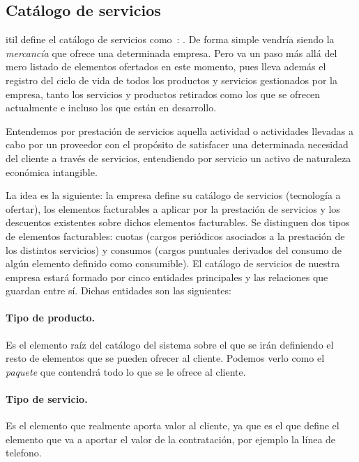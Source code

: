 \subsection{Catálogo de servicios}
\label{sub:catalogo-chap-analisis}

\acrshort{itil} define el catálogo de servicios como~\cite{catalogoITIL}:
. De forma simple vendría siendo la \textit{mercancía} que ofrece una determinada empresa. Pero va un paso más allá del mero listado de elementos ofertados en este momento, pues lleva además el registro del ciclo de vida de todos los productos y servicios gestionados por la empresa, tanto los servicios y productos retirados como los que se ofrecen actualmente e incluso los que están en desarrollo.

Entendemos por prestación de servicios aquella actividad o actividades llevadas a cabo por un proveedor con el propósito de satisfacer una determinada necesidad del cliente a través de servicios, entendiendo por servicio un activo de naturaleza económica intangible.

La idea es la siguiente: la empresa define su catálogo de servicios (tecnología a ofertar), los elementos facturables a aplicar por la prestación de servicios y los descuentos existentes sobre dichos elementos facturables. Se distinguen dos tipos de elementos facturables: cuotas (cargos periódicos asociados a la prestación de los distintos servicios) y consumos (cargos puntuales derivados del consumo de algún elemento definido como consumible).
El catálogo de servicios de nuestra empresa estará formado por cinco entidades principales y las relaciones que guardan entre sí. Dichas entidades son las siguientes:

\paragraph{Tipo de producto.} Es el elemento raíz del catálogo del sistema sobre el que se irán definiendo el resto de elementos que se pueden ofrecer al cliente. Podemos verlo como el \textit{paquete} que contendrá todo lo que se le ofrece al cliente.
\paragraph{Tipo de servicio.} Es el elemento que realmente aporta valor al cliente, ya que es el que define el elemento que va a aportar el valor de la contratación, por ejemplo la línea de telefono.
